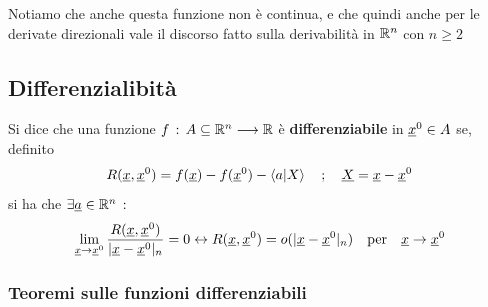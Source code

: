 Notiamo che anche questa funzione non è continua, e che quindi anche per le derivate direzionali vale il discorso fatto sulla derivabilità in $\mathbb{R}^n$ con $n \geq 2$

\newpage

\subsection{Differenzialibità}

Si dice che una funzione $f \, : \, A \subseteq \mathbb{R}^n \longrightarrow \mathbb{R}$ è \textbf{differenziabile} in $\underline{x}^0 \in A$ se, definito
\begin{align}
R(\underline{x},\underline{x}^0)= f(\underline{x}) - f(\underline{x}^0) - \braket{a|X} \quad ; \quad \underline{X}=\underline{x} - \underline{x}^0
\end{align}
si ha che $\exists \underline{a} \in \mathbb{R}^n \, : \,$
\begin{align}
\underset{\underline{x} \rightarrow \underline{x}^0}{\lim} \, \frac{R(\underline{x},\underline{x}^0)}{|\underline{x} - \underline{x}^0|_n}=0 \leftrightarrow R(\underline{x},\underline{x}^0)= o(|\underline{x} - \underline{x}^0|_n) \quad \text{per} \quad \underline{x} \rightarrow \underline{x}^0
\end{align}

\subsubsection{Teoremi sulle funzioni differenziabili}

